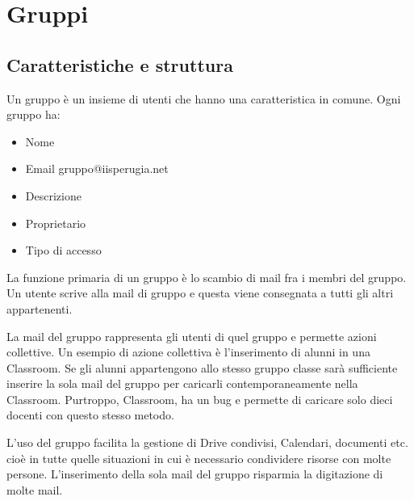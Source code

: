 \chapter{Gruppi}
\section{Caratteristiche e struttura}
Un gruppo è un insieme di utenti che hanno una caratteristica in comune.
Ogni gruppo ha:
\begin{itemize}
	\item Nome	
	\item Email gruppo@iisperugia.net
	\item Descrizione
	\item Proprietario 
	\item Tipo di accesso
\end{itemize}
La funzione primaria di un gruppo è lo scambio di mail fra i membri del gruppo. Un utente scrive alla mail di gruppo e questa viene consegnata a tutti gli altri appartenenti. 

La mail del gruppo rappresenta gli utenti di quel gruppo e permette azioni collettive. Un esempio di azione collettiva è l'inserimento di alunni in una Classroom. Se gli alunni appartengono allo stesso gruppo classe sarà sufficiente inserire la sola mail del gruppo per caricarli contemporaneamente nella Classroom. Purtroppo,  Classroom, ha un bug e permette di caricare solo dieci docenti con questo stesso metodo. 

L'uso del gruppo facilita la gestione di Drive condivisi, Calendari, documenti etc. cioè in tutte quelle situazioni in cui è necessario condividere risorse con molte persone. L'inserimento della sola mail del gruppo risparmia la digitazione di molte mail.

